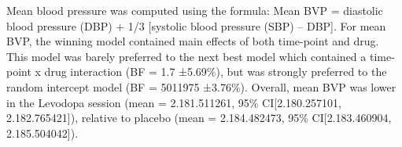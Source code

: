 \documentclass{article}
\begin{document}
Mean blood pressure was computed using the formula: Mean BVP = diastolic
blood pressure (DBP) + 1/3 {[}systolic blood pressure (SBP) -- DBP{]}.
For mean BVP, the winning model contained main effects of both
time-point and drug. This model was barely preferred to the next best
model which contained a time-point x drug interaction (BF = 1.7
±5.69\%), but was strongly preferred to the random intercept model (BF =
5011975 ±3.76\%). Overall, mean BVP was lower in the Levodopa session
(mean = 2.181.511261, 95\% CI{[}2.180.257101, 2.182.765421{]}), relative
to placebo (mean = 2.184.482473, 95\% CI{[}2.183.460904,
2.185.504042{]}).



\end{document}
